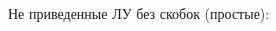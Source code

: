\begin{ex}[type=multi]
	\begin{condition}
		Не приведенные ЛУ без скобок (простые):
		\begin{multicols}{3}
		\end{multicols}
	\end{condition}
\end{ex}